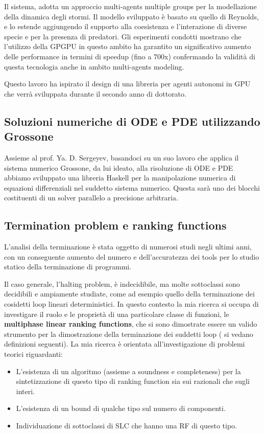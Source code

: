 Il sistema, adotta un approccio multi-agents multiple
groups per la modellazione della dinamica degli stormi. Il modello sviluppato
è basato su quello di Reynolds, e lo estende aggiungendo il supporto alla
coesistenza e l'interazione di diverse specie e per la presenza di predatori.
Gli esperimenti condotti mostrano che l'utilizzo della GPGPU in questo ambito ha
garantito un significativo aumento delle performance in termini di speedup
(fino a 700x) confermando la validità di questa tecnologia anche in ambito
multi-agents modeling. 

Questo lavoro ha ispirato il design di una libreria per
agenti autonomi in GPU che verrà sviluppata durante il secondo anno di dottorato.

\subsection{Soluzioni numeriche di ODE e PDE utilizzando Grossone}
Assieme al prof. Ya. D. Sergeyev, basandoci su un suo lavoro che applica il
sistema numerico Grossone, da lui ideato, alla risoluzione di ODE e PDE
abbiamo sviluppato una libreria Haskell per la manipolazione numerica di
equazioni differenziali nel suddetto sistema numerico. Questa sarà uno dei
blocchi costituenti di un solver parallelo a precisione arbitraria.

 \subsection{Termination problem e ranking functions}
L'analisi della terminazione è stata oggetto di numerosi studi negli ultimi
anni, con un conseguente aumento del numero e dell'accuratezza dei tools per
lo studio statico della terminazione di programmi.

Il caso generale, l'halting problem, è indecidibile, ma molte sottoclassi
sono decidibili e ampiamente studiate, come ad esempio quello della
terminazione dei cosidetti loop lineari deterministici. In questo contesto la mia ricerca si occupa di
investigare il ruolo e le proprietà di una particolare classe di funzioni, le
\textbf{multiphase linear ranking functions}, che si sono dimostrate essere un
valido strumento per la dimostrazione della terminazione dei suddetti loop (
si vedano definizioni seguenti). La mia ricerca è orientata all'investigazione di
problemi teorici riguardanti:
\begin{itemize}
	\item L'esistenza di un algoritmo (assieme a soundness e completeness) per
	la sintetizzazione di questo tipo di ranking function sia sui razionali che sugli interi.
	\item L'esistenza di un bound di qualche tipo sul numero di componenti.
	\item Individuazione di sottoclassi di SLC che hanno una RF di questo tipo.
\end{itemize}



